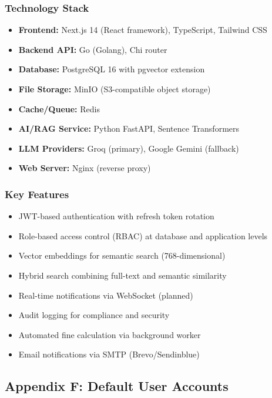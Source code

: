 \documentclass[12pt,a4paper]{article}
\begin{document}
\subsubsection{Technology Stack}
\begin{itemize}[leftmargin=*]
    \item \textbf{Frontend:} Next.js 14 (React framework), TypeScript, Tailwind CSS
    \item \textbf{Backend API:} Go (Golang), Chi router
    \item \textbf{Database:} PostgreSQL 16 with pgvector extension
    \item \textbf{File Storage:} MinIO (S3-compatible object storage)
    \item \textbf{Cache/Queue:} Redis
    \item \textbf{AI/RAG Service:} Python FastAPI, Sentence Transformers
    \item \textbf{LLM Providers:} Groq (primary), Google Gemini (fallback)
    \item \textbf{Web Server:} Nginx (reverse proxy)
\end{itemize}

\subsubsection{Key Features}
\begin{itemize}[leftmargin=*]
    \item JWT-based authentication with refresh token rotation
    \item Role-based access control (RBAC) at database and application levels
    \item Vector embeddings for semantic search (768-dimensional)
    \item Hybrid search combining full-text and semantic similarity
    \item Real-time notifications via WebSocket (planned)
    \item Audit logging for compliance and security
    \item Automated fine calculation via background worker
    \item Email notifications via SMTP (Brevo/Sendinblue)
\end{itemize}

\subsection{Appendix F: Default User Accounts}
\end{document}
